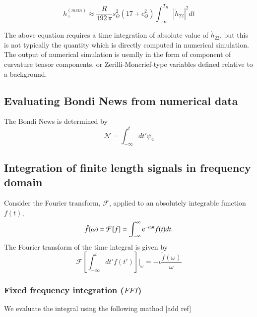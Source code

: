 \documentclass[prd,preprintnumbers,twocolumn,eqsecnum,floatfix,letter]{revtex4}
\begin{document}
\begin{equation}
	h_{+}^{(mem)} \approx \frac{R}{192 \, \pi}s_{\Theta}^{2}\left(17 +c_{\Theta}^{2} \right)\int_{-\infty}^{T_R}|\dot{h}_{22}|^2 dt
\end{equation}

The above equation requires a time integration of absolute value of $\dot{h}_{22}$, but this is not typically the quantity which is directly computed in numerical simulation. The output of numerical simulation is usually in the form of component of curvature tensor components, or Zerilli-Moncrief-type variables defined relative to a background. 
\subsection{Evaluating Bondi News from numerical data}
The Bondi News is determined by
\begin{equation}
	\mathcal{N} = \int_{-\infty}^{t}dt' \psi_4
\end{equation}

\subsection{Integration of finite length signals in frequency domain}

Consider the Fourier transform, $\mathcal{F}$, applied to an absolutely integrable function $f(t)$,
\begin{equation}
	\tilde{f}(\omega) = \mathcal{F}[f]=\int_{-\infty}^{\infty}\mathrm{e}^{-\iota \omega t}f(t)dt.	
\end{equation} 
The Fourier transform of the time integral is given by
\begin{equation}
	\mathcal{F}\left[\int_{-\infty}^{t}dt' f(t')\right] |_\omega = -\iota \frac{\tilde{f}(\omega)}{\omega}
\end{equation}

\subsubsection{Fixed frequency integration ($\mathit{FFI}$)}

We evaluate the integral using the following mathod [add ref]
\end{document}

